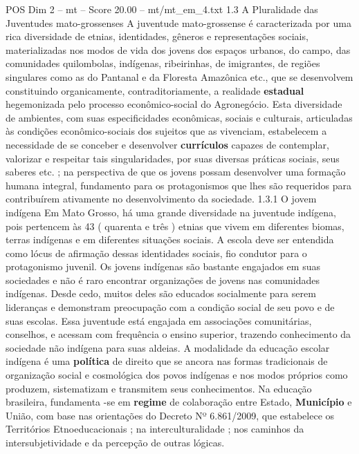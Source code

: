 \begin{textsample}{POS Dim 2 – mt – Score 20.00 – mt/mt\_em\_4.txt}  \label{ex:f2_pos_228}
1.3 A Pluralidade das Juventudes mato-grossenses A juventude mato-grossense é caracterizada por uma rica diversidade de etnias, identidades, gêneros e representações sociais, materializadas nos modos de vida dos jovens dos espaços urbanos, do campo, das comunidades quilombolas, indígenas, ribeirinhas, de imigrantes, de regiões singulares como as do Pantanal e da Floresta Amazônica etc., que se desenvolvem constituindo organicamente, contraditoriamente, a realidade \textbf{estadual} hegemonizada pelo processo econômico-social do Agronegócio.
Esta diversidade de ambientes, com suas especificidades econômicas, sociais e culturais, articuladas às condições econômico-sociais dos sujeitos que as vivenciam, estabelecem a necessidade de se conceber e desenvolver \textbf{currículos} capazes de contemplar, valorizar e respeitar tais singularidades, por suas diversas práticas sociais, seus saberes etc. ; na perspectiva de que os jovens possam desenvolver uma formação humana integral, fundamento para os protagonismos que lhes são requeridos para contribuírem ativamente no desenvolvimento da sociedade. 1.3.1 O jovem indígena Em Mato Grosso, há uma grande diversidade na juventude indígena, pois pertencem às 43 ( quarenta e três ) etnias que vivem em diferentes biomas, terras indígenas e em diferentes situações sociais.
A escola deve ser entendida como lócus de afirmação dessas identidades sociais, fio condutor para o protagonismo juvenil.
Os jovens indígenas são bastante engajados em suas sociedades e não é raro encontrar organizações de jovens nas comunidades indígenas.
Desde cedo, muitos deles são educados socialmente para serem lideranças e demonstram preocupação com a condição social de seu povo e de suas escolas.
Essa juventude está engajada em associações comunitárias, conselhos, e acessam com frequência o ensino superior, trazendo conhecimento da sociedade não indígena para suas aldeias.
A modalidade da educação escolar indígena é uma \textbf{política} de direito que se ancora nas formas tradicionais de organização social e cosmológica dos povos indígenas e nos modos próprios como produzem, sistematizam e transmitem seus conhecimentos.
Na educação brasileira, fundamenta -se em \textbf{regime} de colaboração entre Estado, \textbf{Município} e União, com base nas orientações do Decreto Nº 6.861/2009, que estabelece os Territórios Etnoeducacionais ; na interculturalidade ; nos caminhos da intersubjetividade e da percepção de outras lógicas.

\end{textsample}
